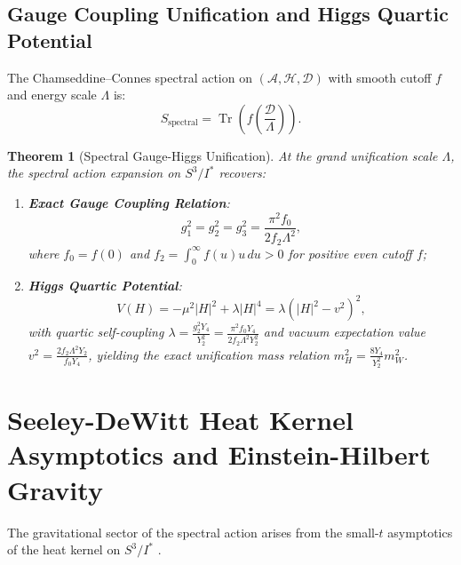 \documentclass[11pt,a4paper]{article}
\newtheorem{theorem}{Theorem}[section]
\theoremstyle{definition}
\newcommand{\Tr}{\operatorname{Tr}}
\newcommand{\PDS}{S^3 / I^*}
\newcommand{\cD}{\mathcal{D}}
\newcommand{\cH}{\mathcal{H}}
\newcommand{\cA}{\mathcal{A}}
\begin{document}
\subsection{Gauge Coupling Unification and Higgs Quartic Potential}
The Chamseddine--Connes spectral action on $(\cA, \cH, \cD)$ with smooth cutoff $f$ and energy scale $\Lambda$ is:
\begin{equation}
    S_{\mathrm{spectral}} = \Tr\left( f\left(\frac{\cD}{\Lambda}\right) \right).
\end{equation}

\begin{theorem}[Spectral Gauge-Higgs Unification]
\label{thm:gauge_higgs_unification}
At the grand unification scale $\Lambda$, the spectral action expansion on $\PDS$ recovers:
\begin{enumerate}
    \item \textbf{Exact Gauge Coupling Relation}:
    \begin{equation}
        g_1^2 = g_2^2 = g_3^2 = \frac{\pi^2 f_0}{2 f_2 \Lambda^2},
    \end{equation}
    where $f_0 = f(0)$ and $f_2 = \int_0^\infty f(u) u\, du > 0$ for positive even cutoff $f$;
    \item \textbf{Higgs Quartic Potential}:
    \begin{equation}
        V(H) = -\mu^2 |H|^2 + \lambda |H|^4 = \lambda \left( |H|^2 - v^2 \right)^2,
    \end{equation}
    with quartic self-coupling $\lambda = \frac{g_2^2 Y_4}{Y_2^2} = \frac{\pi^2 f_0 Y_4}{2 f_2 \Lambda^2 Y_2^2}$ and vacuum expectation value $v^2 = \frac{2 f_2 \Lambda^2 Y_2}{f_0 Y_4}$, yielding the exact unification mass relation $m_H^2 = \frac{8 Y_4}{Y_2^2} m_W^2$.
\end{enumerate}
\end{theorem}

\section{Seeley-DeWitt Heat Kernel Asymptotics and Einstein-Hilbert Gravity}
\label{sec:heat_kernel}

The gravitational sector of the spectral action arises from the small-$t$ asymptotics of the heat kernel on $\PDS$ \cite{Seeley1967,Gilkey1995,Vassilevich2003}.
\end{document}
